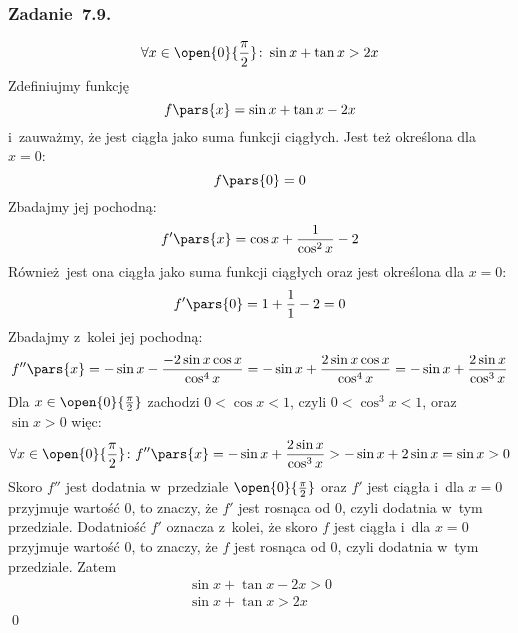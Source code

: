 \subsubsection*{Zadanie~7.9.}
\begin{equation*}
    \forall x \in \open{0}{\frac{\pi}{2}}\colon \sin x + \tan x > 2x
\end{equation*}
Zdefiniujmy funkcję
\begin{equation*}
    f\pars{x} = \sin x + \tan x - 2x
\end{equation*}
i~zauważmy, że jest ciągła jako suma funkcji ciągłych. Jest też określona dla \(x = 0\):
\begin{equation*}
    f\pars{0} = 0
\end{equation*}
Zbadajmy jej pochodną:
\begin{equation*}
    f'\pars{x} = \cos x + \frac{1}{\cos^2x} - 2
\end{equation*}
Również jest ona ciągła jako suma funkcji ciągłych oraz jest określona dla \(x = 0\):
\begin{equation*}
    f'\pars{0} = 1 + \frac{1}{1} - 2 = 0
\end{equation*}
Zbadajmy z~kolei jej pochodną:
\begin{equation*}
    f''\pars{x} = -\sin x - \frac{-2\sin x\cos x}{\cos^4x} = -\sin x + \frac{2\sin x\cos x}{\cos^4x} = -\sin x + \frac{2\sin x}{\cos^3x}
\end{equation*}
Dla \(x \in \open{0}{\frac{\pi}{2}}\) zachodzi \(0 < \cos x < 1\), czyli \(0 < \cos^3x < 1\), oraz \(\sin x > 0\) więc:
\begin{equation*}
    \forall x \in \open{0}{\frac{\pi}{2}}\colon f''\pars{x} = -\sin x + \frac{2\sin x}{\cos^3x} > -\sin x + 2\sin x = \sin x > 0
\end{equation*}
Skoro \(f''\) jest dodatnia w~przedziale \(\open{0}{\frac{\pi}{2}}\) oraz \(f'\) jest ciągła i~dla \(x = 0\) przyjmuje wartość \(0\), to znaczy, że \(f'\) jest rosnąca od \(0\), czyli dodatnia w~tym przedziale. Dodatniość \(f'\) oznacza z~kolei, że skoro \(f\) jest ciągła i~dla \(x = 0\) przyjmuje wartość \(0\), to znaczy, że \(f\) jest rosnąca od \(0\), czyli dodatnia w~tym przedziale. Zatem
\begin{gather*}
    \sin x + \tan x - 2x > 0\\
    \sin x + \tan x > 2x
\end{gather*}
\qed
